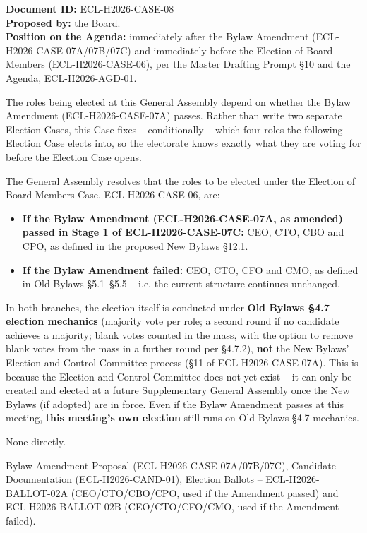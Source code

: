 \documentclass{../../../Common/Latex/Templates/rapport}
\date{[DATE OF GENERAL ASSEMBLY -- TBD]}
\begin{document}
\makecoverpage
\tableofcontents
\reportmainmatter

\noindent\textbf{Document ID:} ECL-H2026-CASE-08\\
\textbf{Proposed by:} the Board.\\
\textbf{Position on the Agenda:} immediately after the Bylaw Amendment (ECL-H2026-CASE-07A/07B/07C) and immediately before the Election of Board Members (ECL-H2026-CASE-06), per the Master Drafting Prompt \S10 and the Agenda, ECL-H2026-AGD-01.

The roles being elected at this General Assembly depend on whether the Bylaw Amendment (ECL-H2026-CASE-07A) passes. Rather than write two separate Election Cases, this Case fixes -- conditionally -- which four roles the following Election Case elects into, so the electorate knows exactly what they are voting for before the Election Case opens.

The General Assembly resolves that the roles to be elected under the Election of Board Members Case, ECL-H2026-CASE-06, are:

\begin{itemize}
  \item \textbf{If the Bylaw Amendment (ECL-H2026-CASE-07A, as amended) passed in Stage 1 of ECL-H2026-CASE-07C:} CEO, CTO, CBO and CPO, as defined in the proposed New Bylaws \S12.1.
  \item \textbf{If the Bylaw Amendment failed:} CEO, CTO, CFO and CMO, as defined in Old Bylaws \S5.1--\S5.5 -- i.e. the current structure continues unchanged.
\end{itemize}

In both branches, the election itself is conducted under \textbf{Old Bylaws \S4.7 election mechanics} (majority vote per role; a second round if no candidate achieves a majority; blank votes counted in the mass, with the option to remove blank votes from the mass in a further round per \S4.7.2), \textbf{not} the New Bylaws' Election and Control Committee process (\S11 of ECL-H2026-CASE-07A). This is because the Election and Control Committee does not yet exist -- it can only be created and elected at a future Supplementary General Assembly once the New Bylaws (if adopted) are in force. Even if the Bylaw Amendment passes at this meeting, \textbf{this meeting's own election} still runs on Old Bylaws \S4.7 mechanics.

None directly.

Bylaw Amendment Proposal (ECL-H2026-CASE-07A/07B/07C), Candidate Documentation (ECL-H2026-CAND-01), Election Ballots -- ECL-H2026-BALLOT-02A (CEO/CTO/CBO/CPO, used if the Amendment passed) and ECL-H2026-BALLOT-02B (CEO/CTO/CFO/CMO, used if the Amendment failed).
\end{document}
